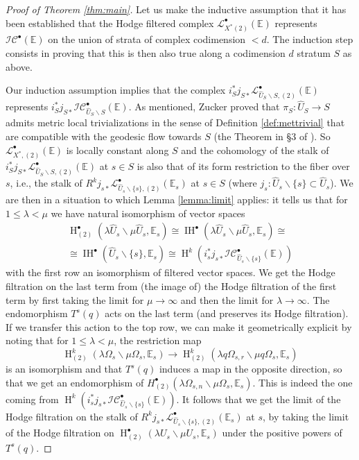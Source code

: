 \documentclass[12pt,letterpaper]{amsart}
\numberwithin{equation}{section}
\def\EE{{\mathbb E}}
\def\ssm{\smallsetminus}
\def\Iscr{{\mathscr I}}
\def\Lscr{{\mathscr L}}
\def\Cscr{{\mathscr C}}
\def\pt{{\scriptscriptstyle\bullet}}
\newcommand\Hl{\operatorname{H}}
\newcommand\IH{\operatorname{IH}}
\theoremstyle{remark}
\begin{document}
\begin{proof}[Proof of Theorem \ref{thm:main}]
Let us make the inductive assumption that  it has been established that the Hodge filtered complex $\Lscr^\pt_{X^*(2)}(\EE)$ represents $\Iscr\Cscr^\pt(\EE)$ on the union of strata of complex codimension $<d$.  
The induction step consists in proving that this is then also true along  a codimension $d$ stratum $S$ as above. 

Our induction assumption implies that the complex  $i^*_Sj_{S*}\Lscr^\pt_{\hat U_S\ssm S,(2)}(\EE)$ represents  $i^*_Sj_{S*}\Iscr\Cscr_{\hat U_S\ssm S}^\pt(\EE)$.  As mentioned, Zucker proved that  $\pi_S:\hat U_S\to S$ admits metric local trivializations in the sense of Definition \ref{def:mettrivial} that are 
compatible with the geodesic flow towards $S$ (the Theorem in \S 3 of \cite{zucker:l2_ii}). So  
 $\Lscr^\pt_{X^*,(2)}(\EE)$ is locally constant along $S$ and the  cohomology  of the stalk of 
$i^*_Sj_{S*}\Lscr^\pt_{\hat U_S\ssm S,(2)}(\EE)$ at $s\in S$  is also that  of its form restriction to the fiber over $s$, i.e., the stalk of 
$R^kj_{s*}\Lscr^\pt_{\hat U_s\ssm \{s\},(2)}(\EE_s)$  at $s\in S$ (where $j_s:\hat U_s\ssm\{s\}\subset \hat U_s$). We are then in a situation to which Lemma \ref{lemma:limit}  applies: it tells us that 
for  $1\le \lambda<\mu$ we have natural isomorphism  of vector spaces
\begin{multline*}
\Hl_{(2)}^\pt(\lambda \hat U_s\ssm \mu\hat U_s, \EE_s )\cong \IH^\pt(\lambda \hat U_s\ssm \mu\hat U_s, \EE_s)\cong \\\cong\IH^\pt(\hat U_s\ssm \{s\}, \EE_s)\cong \Hl^k(i_s^*j_{s*}\Iscr\Cscr^\pt_{\hat U_s\ssm \{s\}}(\EE))
\end{multline*}
with the first row an isomorphism of filtered vector spaces.
We  get the Hodge filtration on the last term  from  (the image of) the Hodge filtration of the first term by first taking the 
limit  for $\mu\to \infty$ and then the limit  for $\lambda\to \infty$.  
The endomorphism  $T^s(q)$ acts on the  last term (and preserves its Hodge filtration). 
If we  transfer this action to the top row, we  can make it geometrically explicit 
by noting that for   $1\le \lambda <\mu$,  the
 restriction map
\begin{equation}\label{eqn:restr}
\Hl_{(2)}^k(\lambda\Omega_{s}\ssm \mu\Omega_{s}, \EE_s )\to \Hl_{(2)}^k(\lambda q\Omega_{s,r}\ssm \mu q\Omega_{s}, \EE_s )
\end{equation}
is an isomorphism and that  $T^s(q)$ induces a map  in the opposite direction, so that we get  an endomorphism of $H_{(2)}^\pt(\lambda\Omega_{s,n}\ssm \mu\Omega_{s}, \EE_s )$. This is indeed  the one coming from $\Hl^k(i_s^*j_{s*}\Iscr\Cscr^\pt_{\hat U_s\ssm \{s\}}(\EE))$. It follows  that we get the limit of the Hodge filtration on the stalk of $R^kj_{s*}\Lscr^\pt_{\hat U_s\ssm \{s\},(2)}(\EE_s)$  at $s$, by taking  the limit of  the Hodge filtration on
$\Hl_{(2)}^\pt(\lambda  U_s\ssm \mu U_s, \EE_s )$ under the positive powers of $T^s(q)$.



\end{proof}
\end{document}
